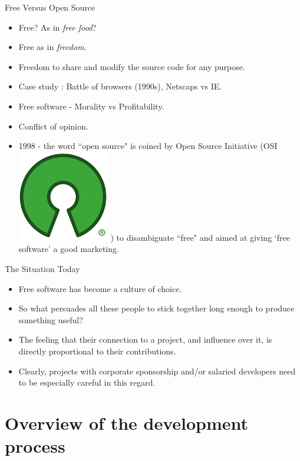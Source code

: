 \documentclass{beamer}
\begin{document}
\begin{frame}{Free Versus Open Source}
\begin{itemize}
	\item Free? As in \emph{free food}? 
	\item Free as in \emph{freedom}. 
	\item Freedom to share and modify the source code for any purpose.
	\item Case study : Battle of browsers (1990s), Netscaps vs IE.
	\item Free software - Morality vs Profitability.
	\item Conflict of opinion.
	\item 1998 - the word ``open source" is coined by Open Source Initiative (OSI \includegraphics[scale=0.1]{./Figures/index.png} ) to disambiguate ``free" and aimed at giving `free software' a good marketing.
\end{itemize}
\end{frame}

\begin{frame}{The Situation Today}
\begin{itemize}
	\item Free software has become a culture of choice.
	\item So what persuades all these people to stick together long enough to produce something useful? 
	\item The feeling that their connection to a project, and influence over it, is directly proportional to their contributions. 
	\item Clearly, projects with corporate sponsorship and/or salaried developers need to be especially careful in this regard.
\end{itemize}
\end{frame}

\section{Overview of the development process}
\end{document}
